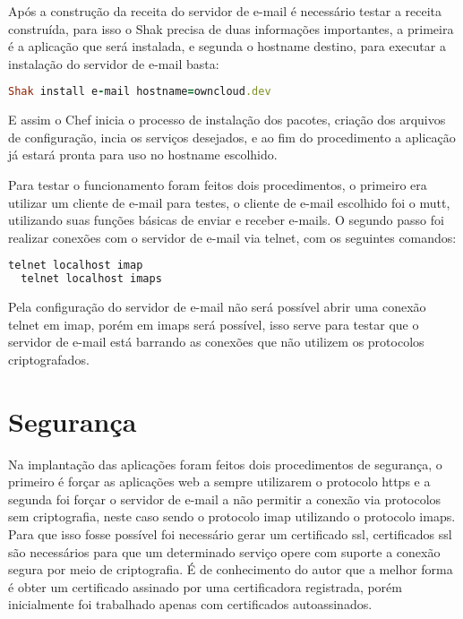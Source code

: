 Após a construção da receita do servidor de e-mail é necessário testar a receita construída,
para isso o Shak precisa de duas informações importantes, a primeira é a aplicação
que será instalada, e segunda o hostname destino, para executar a instalação
do servidor de e-mail basta:

\begin{lstlisting}[language=Ruby,label=dice_index,caption={Exemplo de execução de instalação do servidor de e-mailcom shak}]
Shak install e-mail hostname=owncloud.dev
\end{lstlisting}


E assim o Chef inicia o processo de instalação dos pacotes, criação dos arquivos
de configuração, incia os serviços desejados, e ao fim do procedimento a aplicação
já estará pronta para uso no hostname escolhido.

Para testar o funcionamento foram feitos dois procedimentos, o primeiro era utilizar
um cliente de e-mail para testes, o cliente de e-mail escolhido foi o mutt, utilizando
suas funções básicas de enviar e receber e-mails. O segundo passo foi realizar conexões
com o servidor de e-mail via telnet, com os seguintes comandos:

\begin{lstlisting}[language=Ruby,label=dice_index,caption={Exemplo de teste de conexão telnet no servidor imap}]
  telnet localhost imap
  telnet localhost imaps
\end{lstlisting}

Pela configuração do servidor de e-mail não será possível abrir uma conexão telnet
em imap, porém em imaps será possível, isso serve para testar que o servidor de e-mail
está barrando as conexões que não utilizem os protocolos criptografados.




\section{Segurança}
\label{sub:prototipo}

Na implantação das aplicações foram feitos dois procedimentos de segurança, o primeiro
é forçar as aplicações web a sempre utilizarem o protocolo https e a segunda foi forçar o
servidor de e-mail a não permitir a conexão via protocolos sem criptografia, neste
caso sendo o protocolo imap utilizando o protocolo imaps. Para que isso fosse possível
foi necessário gerar um certificado ssl, certificados ssl são necessários para
que um determinado serviço opere com suporte a conexão segura por meio de criptografia.
É de conhecimento do autor que a melhor forma é obter um certificado assinado
por uma certificadora registrada, porém inicialmente foi trabalhado apenas com certificados
autoassinados.

